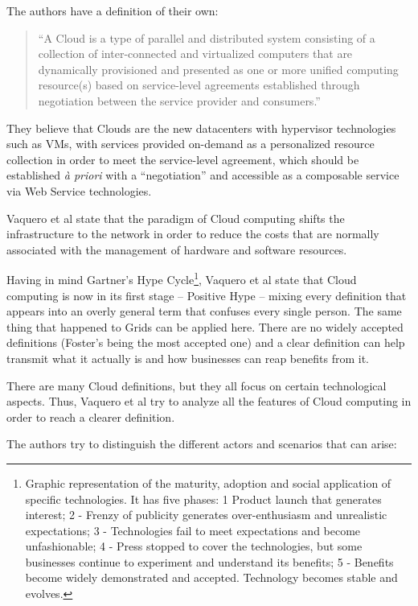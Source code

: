 The authors have a definition of their own:

\begin{quote}
``A Cloud is a type of parallel and distributed system consisting of a collection of inter-connected and virtualized computers that are dynamically provisioned and presented as one or more unified computing resource(s) based on service-level agreements established through negotiation between the service provider and consumers.'' \cite{Buyya2009599}
\end{quote}

They believe that Clouds are the new datacenters with hypervisor technologies such as VMs, with services provided on-demand as a personalized resource collection in order to meet the service-level agreement, which should be established \textit{à priori} with a ``negotiation'' and accessible as a composable service via Web Service technologies.


Vaquero et al state that the paradigm of Cloud computing shifts the infrastructure to the network in order to reduce the costs that are normally associated with the management of hardware and software resources.  

Having in mind Gartner’s Hype Cycle\footnote{Graphic representation of the maturity, adoption and social application of specific technologies. It has five phases: 1  Product launch that generates interest; 2 - Frenzy of publicity generates over-enthusiasm and unrealistic expectations; 3 - Technologies fail to meet expectations and become unfashionable; 4 - Press stopped to cover the technologies, but some businesses continue to experiment and understand its benefits; 5 - Benefits become widely demonstrated and accepted. Technology becomes stable and evolves.}, Vaquero et al state that Cloud computing is now in its first stage – Positive Hype – mixing every definition that appears into an overly general term that confuses every single person. The same thing that happened to Grids can be applied here. There are no widely accepted definitions (Foster’s being the most accepted one) and a clear definition can help transmit what it actually is and how businesses can reap benefits from it.

There are many Cloud definitions, but they all focus on certain technological aspects. Thus, Vaquero et al try to analyze all the features of Cloud computing in order to reach a clearer definition.

The authors try to distinguish the different actors and scenarios that can arise:

